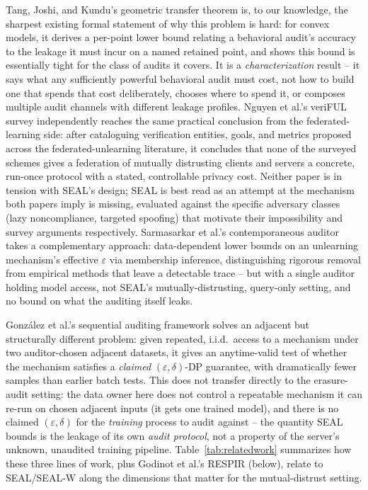 \documentclass[10pt,journal,compsoc]{IEEEtran}
\begin{document}
Tang, Joshi, and Kundu's geometric transfer theorem \cite{tang2026geometric} is, to our knowledge, the sharpest existing formal statement of why this problem is hard: for convex models, it derives a per-point lower bound relating a behavioral audit's accuracy to the leakage it must incur on a named retained point, and shows this bound is essentially tight for the class of audits it covers. It is a \emph{characterization} result -- it says what any sufficiently powerful behavioral audit must cost, not how to build one that spends that cost deliberately, chooses where to spend it, or composes multiple audit channels with different leakage profiles. Nguyen et al.'s veriFUL survey \cite{nguyen2025veriful} independently reaches the same practical conclusion from the federated-learning side: after cataloguing verification entities, goals, and metrics proposed across the federated-unlearning literature, it concludes that none of the surveyed schemes gives a federation of mutually distrusting clients and servers a concrete, run-once protocol with a stated, controllable privacy cost. Neither paper is in tension with SEAL's design; SEAL is best read as an attempt at the mechanism both papers imply is missing, evaluated against the specific adversary classes (lazy noncompliance, targeted spoofing) that motivate their impossibility and survey arguments respectively. Sarmasarkar et al.'s contemporaneous auditor \cite{sarmasarkar2026auditing} takes a complementary approach: data-dependent lower bounds on an unlearning mechanism's effective $\varepsilon$ via membership inference, distinguishing rigorous removal from empirical methods that leave a detectable trace -- but with a single auditor holding model access, not SEAL's mutually-distrusting, query-only setting, and no bound on what the auditing itself leaks.

González et al.'s sequential auditing framework \cite{gonzalez2025sequential} solves an adjacent but structurally different problem: given repeated, i.i.d.\ access to a mechanism under two auditor-chosen adjacent datasets, it gives an anytime-valid test of whether the mechanism satisfies a \emph{claimed} $(\varepsilon,\delta)$-DP guarantee, with dramatically fewer samples than earlier batch tests. This does not transfer directly to the erasure-audit setting: the data owner here does not control a repeatable mechanism it can re-run on chosen adjacent inputs (it gets one trained model), and there is no claimed $(\varepsilon,\delta)$ for the \emph{training} process to audit against -- the quantity SEAL bounds is the leakage of its own \emph{audit protocol}, not a property of the server's unknown, unaudited training pipeline. Table~\ref{tab:relatedwork} summarizes how these three lines of work, plus Godinot et al.'s RESPIR (below), relate to SEAL/SEAL-W along the dimensions that matter for the mutual-distrust setting.
\end{document}
